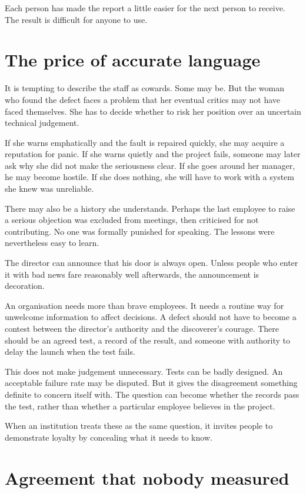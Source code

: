 \documentclass[12pt,a4paper]{book}
\begin{document}
Each person has made the report a little easier for the next person to receive. The result is difficult for anyone to use.

\section*{The price of accurate language}

It is tempting to describe the staff as cowards. Some may be. But the woman who found the defect faces a problem that her eventual critics may not have faced themselves. She has to decide whether to risk her position over an uncertain technical judgement.

If she warns emphatically and the fault is repaired quickly, she may acquire a reputation for panic. If she warns quietly and the project fails, someone may later ask why she did not make the seriousness clear. If she goes around her manager, he may become hostile. If she does nothing, she will have to work with a system she knew was unreliable.

There may also be a history she understands. Perhaps the last employee to raise a serious objection was excluded from meetings, then criticised for not contributing. No one was formally punished for speaking. The lessons were nevertheless easy to learn.

The director can announce that his door is always open. Unless people who enter it with bad news fare reasonably well afterwards, the announcement is decoration.

An organisation needs more than brave employees. It needs a routine way for unwelcome information to affect decisions. A defect should not have to become a contest between the director's authority and the discoverer's courage. There should be an agreed test, a record of the result, and someone with authority to delay the launch when the test fails.

This does not make judgement unnecessary. Tests can be badly designed. An acceptable failure rate may be disputed. But it gives the disagreement something definite to concern itself with. The question can become whether the records pass the test, rather than whether a particular employee believes in the project.

When an institution treats these as the same question, it invites people to demonstrate loyalty by concealing what it needs to know.

\section*{Agreement that nobody measured}
\end{document}
